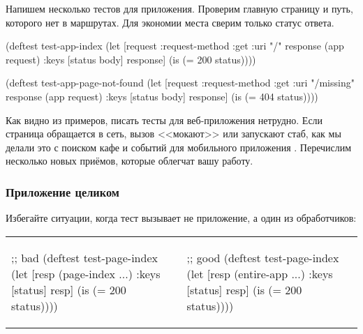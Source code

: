 Напишем несколько тестов для приложения. Проверим главную страницу и путь,
которого нет в маршрутах. Для экономии места сверим только статус ответа.

\begin{english}
  \begin{clojure}
(deftest test-app-index
  (let [request {:request-method :get :uri "/"}
        response (app request)
        {:keys [status body]} response]
    (is (= 200 status))))

(deftest test-app-page-not-found
  (let [request {:request-method :get :uri "/missing"}
        response (app request)
        {:keys [status body]} response]
    (is (= 404 status))))
  \end{clojure}
\end{english}


Как видно из примеров, писать тесты для веб-приложения нетрудно. Если страница
обращается в сеть, вызов <<мокают>> или запускают стаб, как мы делали это с
поиском кафе и событий для мобильного приложения .
Перечислим несколько новых при\"{е}мов, которые облегчат вашу работу.

\subsubsection*{Приложение целиком}

Избегайте ситуации, когда тест вызывает не приложение, а один из
обработчиков:

\noindent
\begin{tabular}{ @{}p{5.5cm} @{}p{5.2cm} }

\begin{english}
  \begin{clojure}
;; bad
(deftest test-page-index
  (let [resp (page-index {...})
        {:keys [status]} resp]
    (is (= 200 status))))
  \end{clojure}
\end{english}

&

\begin{english}
  \begin{clojure}
;; good
(deftest test-page-index
  (let [resp (entire-app {...})
        {:keys [status]} resp]
    (is (= 200 status))))
  \end{clojure}
\end{english}

\end{tabular}

